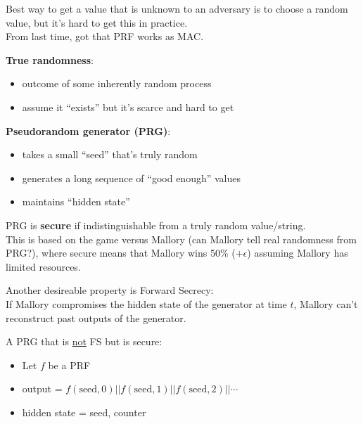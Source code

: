 Best way to get a value that is unknown to an adversary is to choose a random
value, but it's hard to get this in practice.\\

From last time, got that PRF works as MAC.


{\bf True randomness}:
\begin{itemize}
    \item outcome of some inherently random process
    \item assume it ``exists'' but it's scarce and hard to get
\end{itemize}

{\bf Pseudorandom generator (PRG)}:
\begin{itemize}
    \item takes a small ``seed'' that's truly random
    \item generates a long sequence of ``good enough'' values
    \item maintains ``hidden state''
\end{itemize}

\begin{definition}
PRG is {\bf secure} if indistinguishable from a truly random value/string.\\
This is based on the game versus Mallory (can Mallory tell real randomness from
PRG?), where secure means that Mallory wins 50\% ($+\epsilon$) assuming Mallory
has limited resources.
\end{definition}

Another desireable property is Forward Secrecy:\\
If Mallory compromises the hidden state of the generator at time $t$, Mallory
can't reconstruct past outputs of the generator.\\
\begin{example}{A PRG that is \underline{not} FS but is secure:}
    \begin{itemize}
    \item Let $f$ be a PRF
    \item output = $f(\text{seed}, 0) || f(\text{seed}, 1) || f(\text{seed}, 2)
        || \cdots$
    \item hidden state = seed, counter
    \end{itemize}
\end{example}

